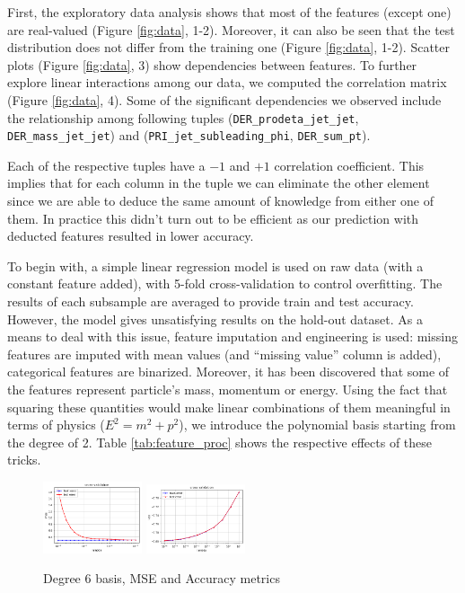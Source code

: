 \documentclass[10pt,conference,compsocconf]{IEEEtran}
\begin{document}
First, the exploratory data analysis shows that most of the features (except one) are real-valued (Figure \ref{fig:data}, 1-2). Moreover, it can also be seen that the test distribution does not differ from the training one (Figure \ref{fig:data}, 1-2). Scatter plots (Figure \ref{fig:data}, 3) show dependencies between features.
To further explore linear interactions among our data, we computed the correlation matrix (Figure \ref{fig:data}, 4).
Some of the significant dependencies we observed include the relationship among following tuples ({\tt DER\_prodeta\_jet\_jet}, {\tt DER\_mass\_jet\_jet})  and ({\tt PRI\_jet\_subleading\_phi}, {\tt DER\_sum\_pt}).

Each of the respective tuples have a $-1$ and $+1$ correlation coefficient. This implies that for each column in the tuple we can eliminate the other element since we are able to deduce the same amount of knowledge from either one of them. In practice this didn't turn out to be efficient as our prediction with deducted features resulted in lower accuracy. 

To begin with, a simple linear regression model is used on raw data (with a constant feature added), with 5-fold cross-validation to control overfitting. The results of each subsample are averaged to provide train and test accuracy. However, the model gives unsatisfying results on the hold-out dataset. As a means to deal with this issue, feature imputation and engineering is used: missing features are imputed with mean values (and ``missing value'' column is added), categorical features are binarized. Moreover, it has been discovered that some of the features represent particle's mass, momentum or energy. Using the fact that squaring these quantities would make linear combinations of them meaningful in terms of physics ($E^2=m^2+p^2$), we introduce the polynomial basis starting from the degree of 2. Table \ref{tab:feature_proc} shows the respective effects of these tricks.

\begin{figure}[!htb]
	\centering \includegraphics[width=110px]{linear_5}
	\centering \includegraphics[width=110px]{ridge_accuracy_deg6}
	\caption{Degree 6 basis, MSE and Accuracy metrics}
	\label{fig:deg6}
\end{figure}
\end{document}
